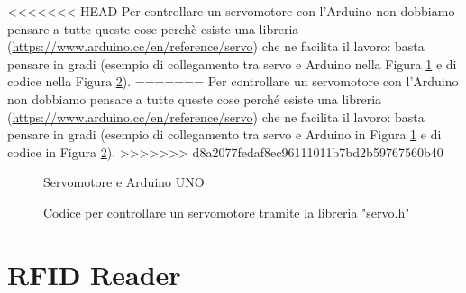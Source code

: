 \documentclass[12pt]{report}
\begin{document}
<<<<<<< HEAD
Per controllare un servomotore con l'Arduino non dobbiamo pensare a tutte queste cose perchè esiste una libreria (\url{https://www.arduino.cc/en/reference/servo}) che ne facilita il lavoro: basta pensare in gradi (esempio di collegamento tra servo e Arduino nella Figura \ref{fig:servo_uno} e di codice nella Figura \ref{fig:servo_code}).
=======
Per controllare un servomotore con l'Arduino non dobbiamo pensare a tutte queste cose perché esiste una libreria (\url{https://www.arduino.cc/en/reference/servo}) che ne facilita il lavoro: basta pensare in gradi (esempio di collegamento tra servo e Arduino in Figura \ref{fig:servo_uno} e di codice in Figura \ref{fig:servo_code}).
>>>>>>> d8a2077fedaf8ec96111011b7bd2b59767560b40

\begin{figure}
	\caption{Servomotore e Arduino UNO}
	\label{fig:servo_uno}
\end{figure}

\begin{figure}
	\caption{Codice per controllare un servomotore tramite la libreria "servo.h"}
	\label{fig:servo_code}
\end{figure}

%
\section{RFID Reader}
%
\end{document}
